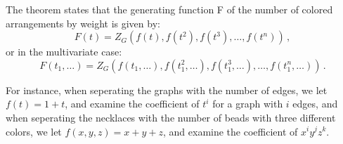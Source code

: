 The theorem states that the generating function F of the number of colored arrangements by weight is given by:
$$F(t)=Z_{G}(f(t),f(t^{2}),f(t^{3}),\ldots ,f(t^{n}))\,,$$
or in the multivariate case:
$$F(t_{1},\ldots )=Z_{G}(f(t_{1},\ldots ),f(t_{1}^{2},\ldots ),f(t_{1}^{3},\ldots ),\ldots ,f(t_{1}^{n},\ldots ))\,.$$

For instance, when seperating the graphs with the number of edges, we let $f(t)=1+t$, and examine the coefficient of $t^i$ for a graph with $i$ edges, and when seperating the necklaces with the number of beads with three different colors, we let $f(x,y,z)=x+y+z$, and examine the coefficient of $x^iy^jz^k$.
\fi
